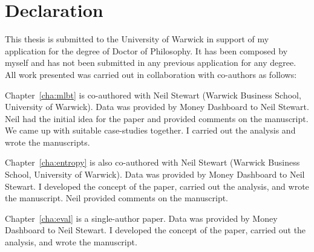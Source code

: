 
\chapter*{Declaration}%
\label{cha:declaration}

This thesis is submitted to the University of Warwick in support of my
application for the degree of Doctor of Philosophy. It has been composed by
myself and has not been submitted in any previous application for any degree.
All work presented was carried out in collaboration with co-authors as
follows:

Chapter~\ref{cha:mlbt} is co-authored with Neil Stewart (Warwick Business
School, University of Warwick). Data was provided by Money Dashboard to Neil
Stewart. Neil had the initial idea for the paper and provided comments on the
manuscript. We came up with suitable case-studies together. I carried out the analysis and wrote the manuscripts.

Chapter~\ref{cha:entropy} is also co-authored with Neil Stewart (Warwick
Business School, University of Warwick). Data was provided by Money Dashboard
to Neil Stewart. I developed the concept of the paper, carried out the
analysis, and wrote the manuscript. Neil provided comments on the manuscript.

Chapter~\ref{cha:eval} is a single-author paper. Data was provided by Money
Dashboard to Neil Stewart. I developed the concept of the paper, carried out
the analysis, and wrote the manuscript.

